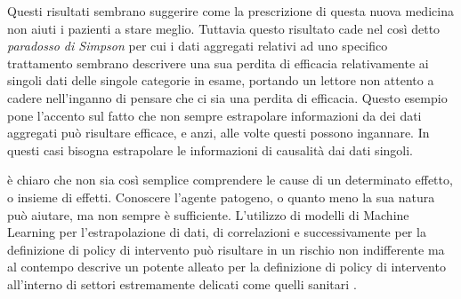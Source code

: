 Questi risultati sembrano suggerire come la prescrizione 
di questa nuova medicina non aiuti i pazienti a stare meglio.
Tuttavia questo risultato cade nel così detto \emph{paradosso di Simpson}
per cui i dati aggregati relativi 
ad uno specifico trattamento sembrano descrivere una sua 
perdita di efficacia relativamente ai singoli dati delle 
singole categorie in esame, portando un lettore non attento 
a cadere nell'inganno di pensare che ci sia una perdita di 
efficacia. Questo esempio pone l'accento sul fatto che non sempre
estrapolare informazioni da dei dati aggregati può risultare
efficace, e anzi, alle volte questi possono ingannare.
In questi casi bisogna estrapolare le informazioni di 
causalità dai dati singoli.

è chiaro che non sia così semplice comprendere le cause 
di un determinato effetto, o insieme di effetti. Conoscere
l'agente patogeno, o quanto meno la sua natura può aiutare,
ma non sempre è sufficiente. L'utilizzo di modelli di 
Machine Learning per l'estrapolazione di dati, di correlazioni
e successivamente per la definizione di policy di intervento
può risultare in un rischio non indifferente ma al contempo 
descrive un potente alleato per la definizione di policy di 
intervento all'interno di settori estremamente delicati come 
quelli sanitari \cite{doi:10.1098/rsos.220638}.